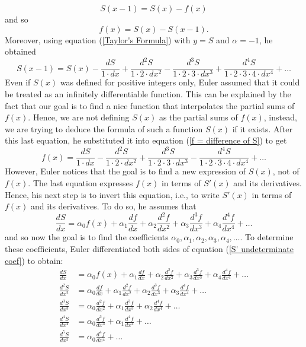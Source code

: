 $$S(x - 1) = S(x) - f(x)$$
and so
\begin{equation} \label{f = difference of S}
    f(x) = S(x) - S(x-1).
\end{equation}
Moreover, using equation (\ref{Taylor's Formula}) with $y = S$ and $\alpha = -1$, he obtained
$$S(x-1) = S(x) - \frac{dS}{1\cdot dx} + \frac{d^2S}{1\cdot 2\cdot dx^2} - \frac{d^3S}{1\cdot 2\cdot 3 \cdot  dx^3} + \frac{d^4S}{1\cdot 2\cdot 3 \cdot 4\cdot dx^4} + \dots$$
Even if $S(x)$ was defined for positive integers only, Euler assumed that it could be treated as an infinitely differentiable function. This can be explained by the fact that our goal is to find a nice function that interpolates the partial sums of $f(x)$. Hence, we are not defining $S(x)$ as the partial sums of $f(x)$, instead, we are trying to deduce the formula of such a function $S(x)$ if it exists. After this last equation, he substituted it into equation (\ref{f = difference of S}) to get
\begin{equation} \label{f in terms of S}
    f(x) = \frac{dS}{1\cdot dx} - \frac{d^2S}{1\cdot 2\cdot dx^2} + \frac{d^3S}{1\cdot 2\cdot 3 \cdot  dx^3} - \frac{d^4S}{1\cdot 2\cdot 3 \cdot 4\cdot dx^4} + \dots
\end{equation}
However, Euler notices that the goal is to find a new expression of $S(x)$, not of $f(x)$. The last equation expresses $f(x)$ in terms of $S'(x)$ and its derivatives. Hence, his next step is to invert this equation, i.e., to write $S'(x)$ in terms of $f(x)$ and its derivatives. To do so, he assumes that
\begin{equation} \label{S' undeterminate coef}
\frac{dS}{dx} = \alpha_0 f(x) + \alpha_1 \frac{df}{dx} + \alpha_2 \frac{d^2f}{dx^2} + \alpha_3 \frac{d^3f}{dx^3} + \alpha_4 \frac{d^4f}{dx^4} + \dots
\end{equation}
and so now the goal is to find the coefficients $\alpha_0, \alpha_1, \alpha_2, \alpha_3, \alpha_4, \dots$. To determine these coefficients, Euler differentiated both sides of equation (\ref{S' undeterminate coef}) to obtain:
\begin{align*}
    \frac{dS}{dx} &= \alpha_0 f(x) + \alpha_1 \frac{df}{dx} + \alpha_2 \frac{d^2f}{dx^2} + \alpha_3 \frac{d^3f}{dx^3} + \alpha_4 \frac{d^4f}{dx^4} + \dots\\
    \frac{d^2S}{dx^2} &= \alpha_0 \frac{df}{dx} + \alpha_1 \frac{d^2f}{dx^2} + \alpha_2 \frac{d^3f}{dx^3} + \alpha_3 \frac{d^4f}{dx^4} + \dots\\
    \frac{d^3S}{dx^3} &= \alpha_0 \frac{d^2f}{dx^2} + \alpha_1 \frac{d^3f}{dx^3} + \alpha_2 \frac{d^4f}{dx^4} + \dots\\
    \frac{d^4S}{dx^4} &= \alpha_0 \frac{d^3f}{dx^3} + \alpha_1 \frac{d^4f}{dx^4} + \dots\\
    \frac{d^5S}{dx^5} &= \alpha_0 \frac{d^4f}{dx^4} + \dots\\
\end{align*}

